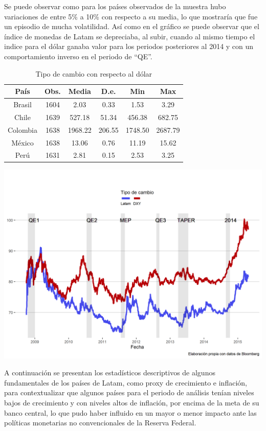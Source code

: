 \documentclass[
  9.5pt,
]{article}
\begin{document}
Se puede observar como para los países observados de la muestra hubo
variaciones de entre 5\% a 10\% con respecto a su media, lo que
mostraría que fue un episodio de mucha volatilidad. Así como en el
gráfico se puede observar que el índice de monedas de Latam se
depreciaba, al subir, cuando al mismo tiempo el indice para el dólar
ganaba valor para los periodos posteriores al 2014 y con un
comportamiento inverso en el periodo de ``QE''.

\begin{table}[H]
  \begin{center}
    \begin{tabular}{| c | c | c | c | c | c |}
      \hline
País    & Obs.  & Media & D.e.  & Min   & Max \\ \hline
Brasil  & 1604 &    2.03     & 0.33 &   1.53    & 3.29 \\
Chile   & 1639  & 527.18 &  51.34 & 456.38 &    682.75 \\
Colombia    & 1638 &    1968.22 & 206.55    & 1748.50   & 2687.79 \\
México  & 1638  & 13.06 & 0.76  & 11.19 & 15.62 \\
Perú    & 1631  & 2.81  & 0.15 &    2.53 &  3.25 \\ \hline
    \end{tabular}
    \caption{Tipo de cambio con respecto al dólar}
  \end{center}
\end{table}

\includegraphics{FX.png}

A continuación se presentan los estadísticos descriptivos de algunos
fundamentales de los países de Latam, como proxy de crecimiento e
inflación, para contextualizar que algunos países para el periodo de
análisis tenían niveles bajos de crecimiento y con niveles altos de
inflación, por encima de la meta de su banco central, lo que pudo haber
influido en un mayor o menor impacto ante las políticas monetarias no
convencionales de la Reserva Federal.
\end{document}
